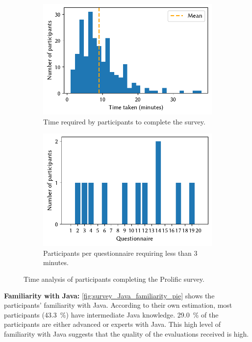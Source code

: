 \documentclass[%
class=scrreprt,
chapterprefix=false,%
open=right,%
twoside=false,%
paper=a4,%
logofile={Logo\_zentral\_farbig\_EN.png},%
thesistype=master,%
UKenglish,%
]{se2thesis}
\theoremstyle{definition}
\begin{document}
	\begin{figure}[tb]
		\centering
		\begin{subfigure}{0.49\textwidth}
			\includegraphics[width=\linewidth]{img/survey_time_histogramm.pdf}
			\caption{Time required by participants to complete the survey.}
			\label{fig:survey_time_histogramm}
		\end{subfigure}
		\hfill
		\begin{subfigure}{0.49\textwidth}
			\includegraphics[width=\linewidth]{img/survey_time_less_than_180.pdf}
			\caption{Participants per questionnaire requiring less than 3 minutes.}
			\label{fig:survey_time_less_than_180}
		\end{subfigure}
		\caption{Time analysis of participants completing the Prolific survey.}
		\label{fig:survey_time_prolific}
	\end{figure}
	
	\textbf{Familiarity with Java:}
	\autoref{fig:survey_Java_familiarity_pie} shows the participants' familiarity with Java. According to their own estimation, most participants (43.3~\%) have intermediate Java knowledge. 29.0~\% of the participants are either advanced or experts with Java. This high level of familiarity with Java suggests that the quality of the evaluations received is high.
	
\end{document}
